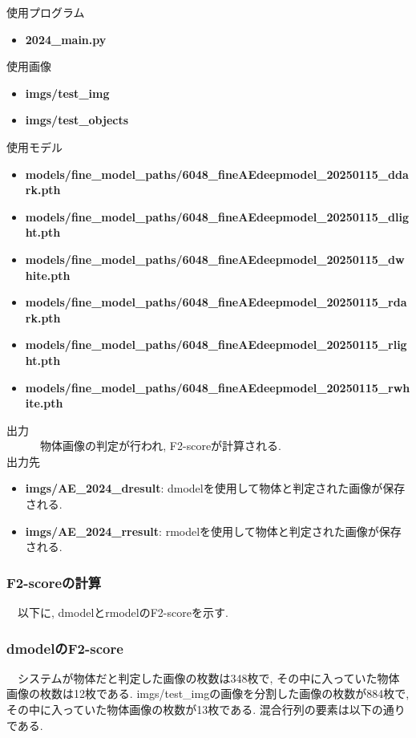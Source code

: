 \documentclass[a4paper, 12pt]{report}
\begin{document}
使用プログラム
\begin{itemize}
    \item \textbf{2024\_main.py}
\end{itemize}

使用画像
\begin{itemize}
    \item \textbf{imgs/test\_img}
    \item \textbf{imgs/test\_objects}
\end{itemize}

使用モデル
\begin{itemize}
    \item \textbf{models/fine\_model\_paths/6048\_fineAEdeepmodel\_20250115\_ddark.pth}
    \item \textbf{models/fine\_model\_paths/6048\_fineAEdeepmodel\_20250115\_dlight.pth}
    \item \textbf{models/fine\_model\_paths/6048\_fineAEdeepmodel\_20250115\_dwhite.pth}
    \item \textbf{models/fine\_model\_paths/6048\_fineAEdeepmodel\_20250115\_rdark.pth}
    \item \textbf{models/fine\_model\_paths/6048\_fineAEdeepmodel\_20250115\_rlight.pth}
    \item \textbf{models/fine\_model\_paths/6048\_fineAEdeepmodel\_20250115\_rwhite.pth}
\end{itemize}

出力\\
　　　物体画像の判定が行われ, F2-scoreが計算される. \\

出力先
\begin{itemize}
    \item \textbf{imgs/AE\_2024\_dresult}: dmodelを使用して物体と判定された画像が保存される. 
    \item \textbf{imgs/AE\_2024\_rresult}: rmodelを使用して物体と判定された画像が保存される. 
\end{itemize}


\subsubsection{F2-scoreの計算}
　以下に, dmodelとrmodelのF2-scoreを示す. 

\subsubsection{dmodelのF2-score}
　システムが物体だと判定した画像の枚数は348枚で, その中に入っていた物体画像の枚数は12枚である. imgs/test\_imgの画像を分割した画像の枚数が884枚で, その中に入っていた物体画像の枚数が13枚である. 混合行列の要素は以下の通りである. 
\end{document}
